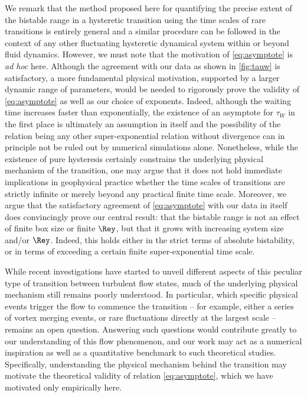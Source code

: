 \documentclass[]{jfm}
\begin{document}
We remark that the method proposed here for quantifying the precise extent of the bistable range in a hysteretic transition using the time scales of rare transitions is entirely general and a similar procedure can be followed in the context of any other fluctuating hysteretic dynamical system within or beyond fluid dynamics. However, we must note that the motivation of \eqref{eq:asymptote} is \textit{ad hoc} here. Although the agreement with our data as shown in \ref{fig:tauw} is satisfactory, a more fundamental physical motivation, supported by a larger dynamic range of parameters, would be needed to rigorously prove the validity of \eqref{eq:asymptote} as well as our choice of exponents. Indeed, although the waiting time increases faster than exponentially, the existence of an asymptote for $\tau_W$ in the first place is ultimately an assumption in itself and the possibility of the relation being any other super-exponential relation without divergence can in principle not be ruled out by numerical simulations alone. Nonetheless, while the existence of pure hysteresis certainly constrains the underlying physical mechanism of the transition, one may argue that it does not hold immediate implications in geophysical practice whether the time scales of transitions are strictly infinite or merely beyond any practical finite time scale. Moreover, we argue that the satisfactory agreement of \eqref{eq:asymptote} with our data in itself does convincingly prove our central result: that the bistable range is not an effect of finite box size or finite $\Rey$, but that it grows with increasing system size and/or $\Rey$. Indeed, this holds either in the strict terms of absolute bistability, or in terms of exceeding a certain finite super-exponential time scale.

While recent investigations have started to unveil different aspects of this peculiar type of transition between turbulent flow states, much of the underlying physical mechanism still remains poorly understood. In particular, which specific physical events trigger the flow to commence the transition -- for example, either a series of vortex merging events, or rare fluctuations directly at the largest scale -- remains an open question. Answering such questions would contribute greatly to our understanding of this flow phenomenon, and our work may act as a numerical inspiration as well as a quantitative benchmark to such theoretical studies. Specifically, understanding the physical mechanism behind the transition may motivate the theoretical validity of relation \eqref{eq:asymptote}, which we have motivated only empirically here.
\end{document}
